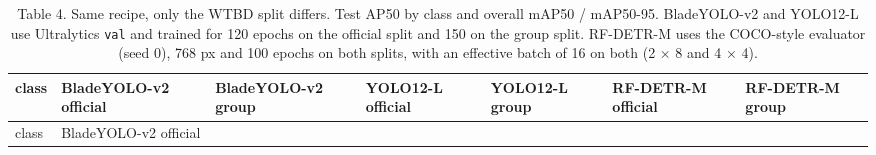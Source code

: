 \documentclass[
  10pt,
]{article}
\begin{document}
\begin{longtable}[]{@{}
  >{\raggedright\arraybackslash}p{}
  >{\raggedright\arraybackslash}p{}
  >{\raggedright\arraybackslash}p{}
  >{\raggedright\arraybackslash}p{}
  >{\raggedright\arraybackslash}p{}
  >{\raggedright\arraybackslash}p{}
  >{\raggedright\arraybackslash}p{}@{}}
\caption{Table 4. Same recipe, only the WTBD split differs. Test AP50 by
class and overall mAP50 / mAP50-95. BladeYOLO-v2 and YOLO12-L use
Ultralytics \texttt{val} and trained for 120 epochs on the official
split and 150 on the group split. RF-DETR-M uses the COCO-style
evaluator (seed 0), 768 px and 100 epochs on both splits, with an
effective batch of 16 on both (2 × 8 and 4 × 4).}\tabularnewline
\toprule\noalign{}
\begin{minipage}[b]{\linewidth}\raggedright
class
\end{minipage} & \begin{minipage}[b]{\linewidth}\raggedright
BladeYOLO-v2 official
\end{minipage} & \begin{minipage}[b]{\linewidth}\raggedright
BladeYOLO-v2 group
\end{minipage} & \begin{minipage}[b]{\linewidth}\raggedright
YOLO12-L official
\end{minipage} & \begin{minipage}[b]{\linewidth}\raggedright
YOLO12-L group
\end{minipage} & \begin{minipage}[b]{\linewidth}\raggedright
RF-DETR-M official
\end{minipage} & \begin{minipage}[b]{\linewidth}\raggedright
RF-DETR-M group
\end{minipage} \\
\midrule\noalign{}
\endfirsthead
\toprule\noalign{}
\begin{minipage}[b]{\linewidth}\raggedright
class
\end{minipage} & \begin{minipage}[b]{\linewidth}\raggedright
BladeYOLO-v2 official
\end{minipage} & \begin{minipage}[b]{\linewidth}\raggedright

\end{minipage}
\end{longtable}
\end{document}
